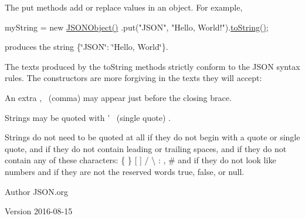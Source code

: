 The {\ttfamily put} methods add or replace values in an object. For example,


\begin{DoxyPre}
myString = new \hyperlink{classorg_1_1json_1_1JSONObject_a7c17e59daff74ce50c6677c6f5da233d}{JSONObject()}
        .put("JSON", "Hello, World!").\hyperlink{classorg_1_1json_1_1JSONObject_a7f8cab6eb354ceb416a421574b4be424}{toString()};
\end{DoxyPre}


produces the string {\ttfamily \{\char`\"{}\-J\-S\-O\-N\char`\"{}\-: \char`\"{}\-Hello, World\char`\"{}\}}. 

The texts produced by the {\ttfamily to\-String} methods strictly conform to the J\-S\-O\-N syntax rules. The constructors are more forgiving in the texts they will accept\-: 
\begin{DoxyItemize}
\item An extra {\ttfamily ,}~
\footnotesize (comma)
\normalsize  may appear just before the closing brace. 
\item Strings may be quoted with {\ttfamily '}~
\footnotesize (single quote)
\normalsize . 
\item Strings do not need to be quoted at all if they do not begin with a quote or single quote, and if they do not contain leading or trailing spaces, and if they do not contain any of these characters\-: {\ttfamily \{ \} \mbox{[} \mbox{]} / \textbackslash{} \-: , \#} and if they do not look like numbers and if they are not the reserved words {\ttfamily true}, {\ttfamily false}, or {\ttfamily null}. 
\end{DoxyItemize}

\begin{DoxyAuthor}{Author}
J\-S\-O\-N.\-org 
\end{DoxyAuthor}
\begin{DoxyVersion}{Version}
2016-\/08-\/15 
\end{DoxyVersion}
